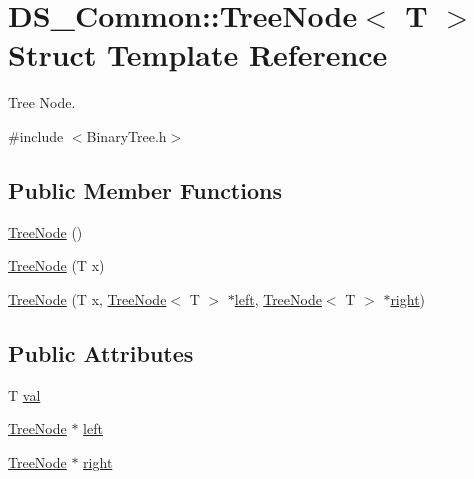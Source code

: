 \hypertarget{struct_d_s___common_1_1_tree_node}{}\section{D\+S\+\_\+\+Common\+:\+:Tree\+Node$<$ T $>$ Struct Template Reference}
\label{struct_d_s___common_1_1_tree_node}


Tree Node.  




{\ttfamily \#include $<$Binary\+Tree.\+h$>$}

\subsection*{Public Member Functions}
\begin{DoxyCompactItemize}
\item 
\mbox{\hyperlink{struct_d_s___common_1_1_tree_node_abedd8beddee85b4d2ebf4178dd012b5f}{Tree\+Node}} ()
\item 
\mbox{\hyperlink{struct_d_s___common_1_1_tree_node_a7fa8e6ded4baa92f787cccf84cb4f396}{Tree\+Node}} (T x)
\item 
\mbox{\hyperlink{struct_d_s___common_1_1_tree_node_a52b577e7f53fedb7bf1c88d98e0b933b}{Tree\+Node}} (T x, \mbox{\hyperlink{struct_d_s___common_1_1_tree_node}{Tree\+Node}}$<$ T $>$ $\ast$\mbox{\hyperlink{struct_d_s___common_1_1_tree_node_ae2579ab4d93c06c49a5ddaa4097cc55d}{left}}, \mbox{\hyperlink{struct_d_s___common_1_1_tree_node}{Tree\+Node}}$<$ T $>$ $\ast$\mbox{\hyperlink{struct_d_s___common_1_1_tree_node_a55f75143e837cd009739ab32f49c93e6}{right}})
\end{DoxyCompactItemize}
\subsection*{Public Attributes}
\begin{DoxyCompactItemize}
\item 
T \mbox{\hyperlink{struct_d_s___common_1_1_tree_node_a24807010f9e48c1a829c05e6384b199e}{val}}
\item 
\mbox{\hyperlink{struct_d_s___common_1_1_tree_node}{Tree\+Node}} $\ast$ \mbox{\hyperlink{struct_d_s___common_1_1_tree_node_ae2579ab4d93c06c49a5ddaa4097cc55d}{left}}
\item 
\mbox{\hyperlink{struct_d_s___common_1_1_tree_node}{Tree\+Node}} $\ast$ \mbox{\hyperlink{struct_d_s___common_1_1_tree_node_a55f75143e837cd009739ab32f49c93e6}{right}}
\end{DoxyCompactItemize}



